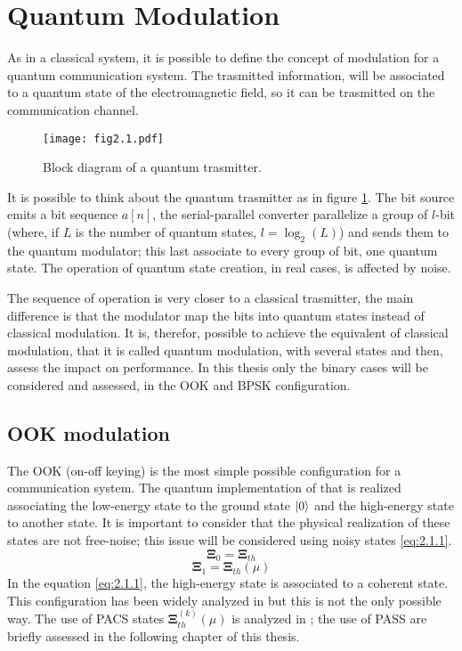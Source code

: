 \section{Quantum Modulation}
    As in a classical system, it is possible to define the concept of modulation for a 
    quantum communication system. The trasmitted information, will be associated to a 
    quantum state of the electromagnetic field, so it can be trasmitted on the communication 
    channel.

    \begin{figure}[ht]
        \texttt{[image: fig2.1.pdf]}
        \caption{Block diagram of a quantum trasmitter.}
        \label{fig:2.1}
    \end{figure}
    It is possible to think about the quantum trasmitter as in figure \ref{fig:2.1}. The bit source
    emits a bit sequence $a[n]$, the serial-parallel converter parallelize a group of $l$-bit (where,
    if $L$ is the number of quantum states, $l=\log_2(L)$) and sends them to the quantum modulator;
    this last associate to every group of bit, one quantum state. The operation of quantum state 
    creation, in real cases, is affected by noise.

    The sequence of operation is very closer to a classical trasmitter, the main difference is that
    the modulator map the bits into quantum states instead of classical modulation. It is, therefor, 
    possible to achieve the equivalent of classical modulation, that it is called quantum modulation,
    with several states and then, assess the impact on performance.
    In this thesis only the binary cases will be considered and assessed, in the OOK and BPSK 
    configuration.
    
    \subsection{OOK modulation}
        The OOK (on-off keying) is the most simple possible configuration for a communication system.
        The quantum implementation of that is realized associating the low-energy state to the 
        ground state $\ket{0}$ and the high-energy state to another state. It is important to
        consider that the physical realization of these states are not free-noise; this issue will be
        considered using noisy states \ref{eq:2.1.1}.
        \begin{equation}
            \pmb{\Xi}_0 = \pmb{\Xi}_{th}
            \label{eq:2.1.1}
        \end{equation}
        \begin{equation*}
            \pmb{\Xi}_1 = \pmb{\Xi}_{th}(\mu)
        \end{equation*}
        In the equation \ref{eq:2.1.1}, the high-energy state is associated to a coherent state. This 
        configuration has been widely analyzed in \cite{helstrom1,helstrom2,coherentComm1,coherentComm2,
        coherentComm3,coherentComm4} but this is not the only possible way. The use of PACS states 
        $\pmb{\Xi}_{th}^{(k)}(\mu)$ is analyzed in \cite{PACSDisc,tesiGuerrini}; the use of PASS are briefly
        assessed in the following chapter of this thesis.

